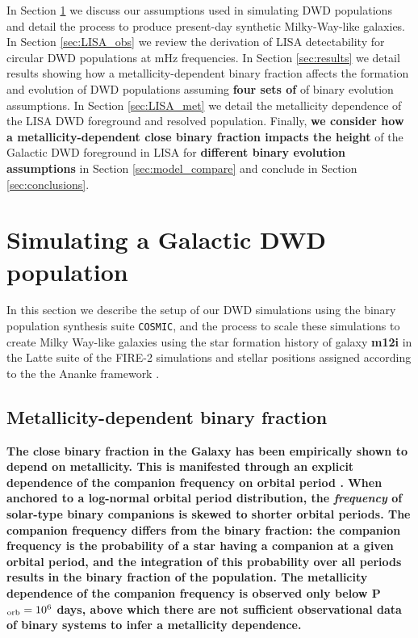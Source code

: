 \documentclass[twocolumn, linenumbers]{aastex631}
\newcommand{\cosmic}{\texttt{COSMIC}}
\begin{document}
In Section \ref{sec:simulations} we discuss our assumptions used in simulating DWD populations and detail the process to produce present-day synthetic Milky-Way-like galaxies. In Section \ref{sec:LISA_obs} we review the derivation of LISA detectability for circular DWD populations at mHz frequencies. In Section \ref{sec:results} we detail results showing how a metallicity-dependent binary fraction affects the formation and evolution of DWD populations assuming \textbf{four sets of} of binary evolution assumptions. In Section \ref{sec:LISA_met} we detail the metallicity dependence of the LISA DWD foreground and resolved population. Finally, \textbf{we consider how a metallicity-dependent close binary fraction impacts the height} of the Galactic DWD foreground in LISA for \textbf{different binary evolution assumptions} in Section \ref{sec:model_compare} and conclude in Section \ref{sec:conclusions}.  

\section{Simulating a Galactic DWD population}\label{sec:simulations}
In this section we describe the setup of our DWD simulations using the binary population synthesis suite \cosmic, and the process to scale these simulations to create Milky Way-like galaxies using the star formation history of galaxy \textbf{\textbf{m12i}} in the Latte suite of the FIRE-2 simulations \citep{Wetzel2016, Hopkins2018} and stellar positions assigned according to the the Ananke framework \citep{Sanderson2020}. 

\subsection{Metallicity-dependent binary fraction}\label{subsec:metbinfrac}
\textbf{The close binary fraction in the Galaxy has been empirically shown to depend on metallicity. This is manifested through an explicit dependence of the companion frequency on orbital period \citep{Moe2021}. When anchored to a log-normal orbital period distribution, the \emph{frequency} of solar-type binary companions is skewed to shorter orbital periods. The companion frequency differs from the binary fraction: the companion frequency is the probability of a star having a companion at a given orbital period, and the integration of this probability over all periods results in the binary fraction of the population. The metallicity dependence of the companion frequency is observed only below P$_{\rm{orb}}=10^6$ days, above which there are not sufficient observational data of binary systems to infer a metallicity dependence.}
\end{document}
